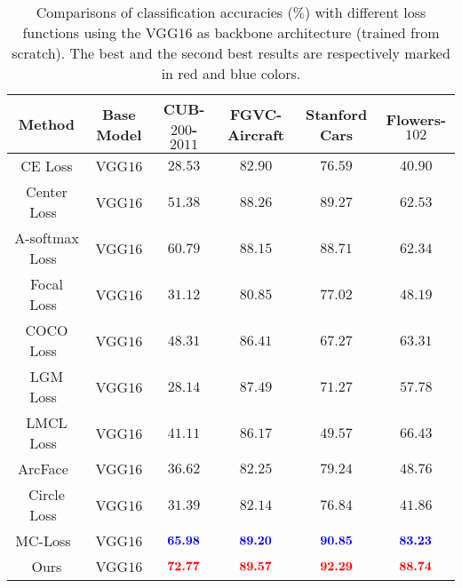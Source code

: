 \documentclass[journal]{IEEEtran}
\def\tblue#1{\textcolor[rgb]{0,0,1}{#1}} %
\def\tred#1{\textcolor[rgb]{1,0,0}{#1}}  %
\begin{document}
\begin{table*}[!t]
  \centering
  \footnotesize
  \caption{Comparisons of classification accuracies ($\%$) with different loss functions using the VGG$16$ as backbone architecture (trained from scratch). The best and the second best results are respectively marked in red and blue colors.}
  \begin{adjustbox}{width=0.8\linewidth,center}
   \Huge   %
    \begin{tabular}{|c|c|c|c|c|c|}
    \hline
    Method     & Base Model             & CUB-$200$-$2011$   & FGVC-Aircraft      & Stanford Cars     & Flowers-$102$ \\
    \hline
    \hline
    CE Loss    & VGG$16$   & $28.53$   & $82.90$    & $76.59$  & $40.90$  \\
Center Loss~\cite{wen2016discriminative}&VGG$16$& $51.38$& $88.26$& $89.27$&$62.53$  \\
A-softmax Loss~\cite{liu2017sphereface}& VGG$16$& $60.79$& $88.15$ & $88.71$& $62.34$  \\
    Focal Loss~\cite{lin2017focal} & VGG$16$& $31.12$  & $80.85$  & $77.02$ & $48.19$ \\
    COCO Loss~\cite{liu2017rethinking} & VGG$16$ & $48.31$& $86.41$ & $67.27$& $63.31$ \\
    LGM Loss~\cite{wan2018rethinking}& VGG$16$& $28.14$ & $87.49$ & $71.27$ & $57.78$  \\
    LMCL Loss~\cite{wang2018cosface}& VGG$16$& $41.11$& $86.17$& $49.57$& $66.43$\\
    ArcFace~\cite{deng2019arcface}& VGG$16$& $36.62$& $82.25$& $79.24$& $48.76$\\
    Circle Loss~\cite{sun2020circle}& VGG$16$& $31.39$& $82.14$& $76.84$& $41.86$\\
    MC-Loss~\cite{chang2020mc} & VGG$16$ & $\textbf{\tblue{65.98}}$ & $\textbf{\tblue{89.20}}$& $\textbf{\tblue{90.85}}$ & $\textbf{\tblue{83.23}}$ \\
    \hline
    \hline
    Ours & VGG$16$& $\textbf{\tred{72.77}}$ & $\textbf{\tred{89.57}}$& $\textbf{\tred{92.29}}$ & $\textbf{\tred{88.74}}$ \\
    \hline
    \end{tabular}%
       \end{adjustbox}
  \label{tab:results_1}%
\end{table*}%
\end{document}
